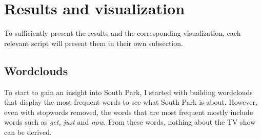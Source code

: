 \documentclass[10pt,a4paper]{article}
\begin{document}
	
	\newpage
	\section{Results and visualization}
	
	To sufficiently present the results and the corresponding visualization, each relevant script will present them in their own subsection.
	
	\subsection{Wordclouds}
	To start to gain an insight into South Park, I started with building wordclouds that display the most frequent words to see what South Park is about. However, even with stopwords removed, the words that are most frequent mostly include words such as \textit{get, just} and \textit{now}. From these words, nothing about the TV show can be derived. 
	
\end{document}

